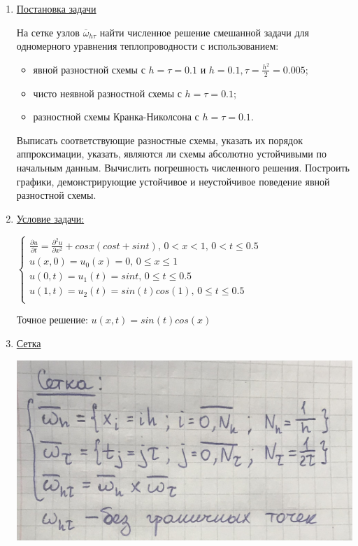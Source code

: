 \documentclass{article}%
\begin{document}
\begin{enumerate}%
\item%
\underline{Постановка задачи}

На сетке узлов $\overline{\omega}_{h\tau}$ найти численное решение смешанной задачи для одномерного уравнения теплопроводности с использованием:
\begin{itemize}
\item явной разностной схемы с $h=\tau=0.1$ и $h=0.1, \tau=\frac{h^2}{2}=0.005$;
\item чисто неявной разностной схемы с $h=\tau=0.1$;
\item разностной схемы Кранка-Николсона с $h=\tau=0.1$.
\end{itemize}
Выписать соответствующие разностные схемы, указать их порядок аппроксимации, указать, являются ли схемы абсолютно устойчивыми по начальным данным. 
Вычислить погрешность численного решения. 
Построить графики, демонстрирующие устойчивое и неустойчивое поведение явной разностной схемы.

\item%
\underline{Условие задачи:}

$\begin{cases} 
\frac{\partial u}{\partial t} = \frac{\partial^2 u}{\partial x^2} + cosx(cost+sint),\,  0<x<1,\, 0<t\le0.5 \\
u(x,0)=u_0(x)=0,\, 0\le x\le1 \\
u(0, t)=u_1(t)=sint,\, 0\le t\le0.5 \\
u(1, t)=u_2(t)=sin(t)cos(1),\, 0\le t\le0.5 \\
\end{cases}$

Точное решение: $u(x, t) = sin(t)cos(x)$

\item%
\underline{Сетка}

\includegraphics[scale=0.1]{img00.JPG}


\end{enumerate}
\end{document}
